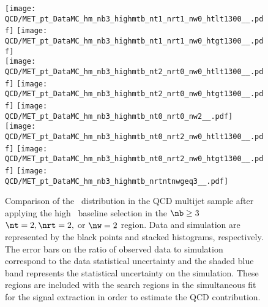\begin{figure}[!htb]
	\begin{center}
  \texttt{[image: QCD/MET\_pt\_DataMC\_hm\_nb3\_highmtb\_nt1\_nrt1\_nw0\_htlt1300\_\_.pdf]} 
  \texttt{[image: QCD/MET\_pt\_DataMC\_hm\_nb3\_highmtb\_nt1\_nrt1\_nw0\_htgt1300\_\_.pdf]} \\  
  \texttt{[image: QCD/MET\_pt\_DataMC\_hm\_nb3\_highmtb\_nt2\_nrt0\_nw0\_htlt1300\_\_.pdf]} 
  \texttt{[image: QCD/MET\_pt\_DataMC\_hm\_nb3\_highmtb\_nt2\_nrt0\_nw0\_htgt1300\_\_.pdf]} 
  \texttt{[image: QCD/MET\_pt\_DataMC\_hm\_nb3\_highmtb\_nt0\_nrt0\_nw2\_\_.pdf]} \\
  \texttt{[image: QCD/MET\_pt\_DataMC\_hm\_nb3\_highmtb\_nt0\_nrt2\_nw0\_htlt1300\_\_.pdf]} 
  \texttt{[image: QCD/MET\_pt\_DataMC\_hm\_nb3\_highmtb\_nt0\_nrt2\_nw0\_htgt1300\_\_.pdf]} 
  \texttt{[image: QCD/MET\_pt\_DataMC\_hm\_nb3\_highmtb\_nrtntnwgeq3\_\_.pdf]} \\
	\end{center}
	\caption[QCD Multijet HM Control Region $\nb\geq3$ with 2 heavy objects]{Comparison of the \met~distribution in the QCD multijet sample after applying the high \dm~baseline selection in the $\nb\geq3$ $\nt=2, \nrt=2,$ or $\nw=2$ region. Data and simulation are represented by the black points and stacked histograms, respectively. The error bars on the ratio of observed data to simulation correspond to the data statistical uncertainty and the shaded blue band represents the statistical uncertainty on the simulation. These regions are included with the search regions in the simultaneous fit for the signal extraction in order to estimate the QCD contribution.
	 }
	\label{fig:qcd-cr-datavsmc-hm-nb3-2}
\end{figure}
